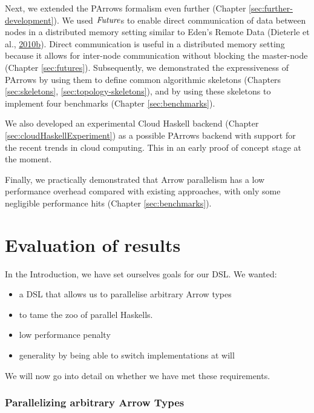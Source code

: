 \documentclass[paper=A4,twoside=true,openright,parskip=full,chapterprefix=true,headings=normal,bibliography=totoc,listof=totoc,titlepage=on,captions=tableabove,draft=false,british]{scrreprt}%
\providecommand{\tightlist}{%
    \setlength{\itemsep}{0pt}\setlength{\parskip}{0pt}}
\begin{document}
Next, we extended the PArrows formalism even further (Chapter
\ref{sec:further-development}). We used \ensuremath{\Conid{Future}}s to enable direct
communication of data between nodes in a distributed memory setting
similar to Eden's Remote Data (Dieterle et al.,
\protect\hyperlink{ref-Dieterle2010}{2010}\protect\hyperlink{ref-Dieterle2010}{b}).
Direct communication is useful in a distributed memory setting because
it allows for inter-node communication without blocking the master-node
(Chapter \ref{sec:futures}). Subsequently, we demonstrated the
expressiveness of PArrows by using them to define common algorithmic
skeletons (Chapters \ref{sec:skeletons}, \ref{sec:topology-skeletons}),
and by using these skeletons to implement four benchmarks (Chapter
\ref{sec:benchmarks}).

We also developed an experimental Cloud Haskell backend (Chapter
\ref{sec:cloudHaskellExperiment}) as a possible PArrows backend with
support for the recent trends in cloud computing. This in an early proof
of concept stage at the moment.

Finally, we practically demonstrated that Arrow parallelism has a low
performance overhead compared with existing approaches, with only some
negligible performance hits (Chapter \ref{sec:benchmarks}).

\hypertarget{evaluation-of-results-1}{%
\section{Evaluation of results}\label{evaluation-of-results-1}}

\label{sec:outlookEval}

In the Introduction, we have set ourselves goals for our DSL. We wanted:

\begin{itemize}
\tightlist
\item
  a DSL that allows us to parallelise arbitrary Arrow types
\item
  to tame the zoo of parallel Haskells.
\item
  low performance penalty
\item
  generality by being able to switch implementations at will
\end{itemize}

We will now go into detail on whether we have met these requirements.

\hypertarget{parallelizing-arbitrary-arrow-types}{%
\subsubsection{Parallelizing arbitrary Arrow
Types}\label{parallelizing-arbitrary-arrow-types}}
\end{document}
